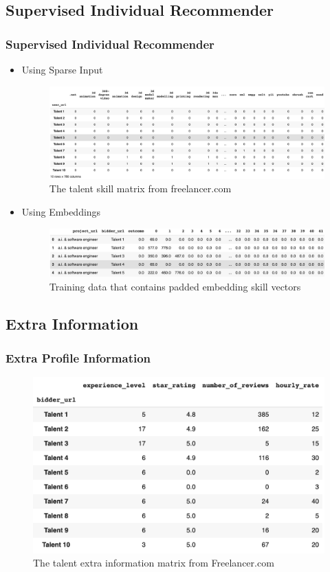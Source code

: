 \documentclass{beamer}
\begin{document}
\subsection{Supervised Individual Recommender} 
\begin{frame}
\frametitle{Supervised Individual Recommender}
\begin{itemize}
	\item Using Sparse Input
	\begin{figure}
		\includegraphics[scale=0.2]{images/FreelancerTalentSkillsMatrix} 
		\caption{The talent skill matrix from freelancer.com}
	\end{figure}
	\item Using Embeddings
	\begin{figure}
		\includegraphics[scale=0.2]{images/EmbeddingTrainingMatrix} 
		\caption{Training data that contains padded embedding skill vectors}
	\end{figure}
\end{itemize} 
\end{frame}


\subsection{Extra Information} 
\begin{frame}
\frametitle{Extra Profile Information }
\begin{figure}
\includegraphics[scale=0.4]{images/FreelancerTalentMeta} 
\caption{The talent extra information matrix from Freelancer.com}
\end{figure}
\end{frame}
\end{document}
